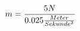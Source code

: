 \documentclass[preview]{standalone}
\begin{document}
\begin{align*}
{\special{dvisvgm:raw <g id='unique000'>}m = \frac{5N}{0.025 \frac{Meter}{Sekunde^{2}}}}\special{dvisvgm:raw </g>}
\end{align*}
\end{document}
